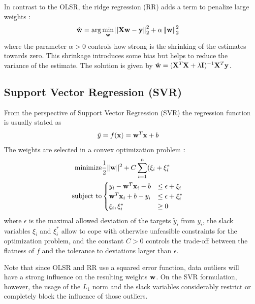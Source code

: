 In contrast to the OLSR, the ridge regression (RR) adds a term to
penalize large weights \citep{scikitlearn2011}:
\begin{equation*}
\hat{\mathbf{w}} = 
\arg\min_{\mathbf{w}} \left\| \mathbf{X}\mathbf{w} - \mathbf{y} \right\|_2^2 + 
                 \alpha \left\|\mathbf{w}\right\|_2^2 
\end{equation*}
where the parameter $\alpha>0$ controls how strong is the shrinking of
the estimates towards zero.  This shrinkage introduces some bias but
helps to reduce the variance of the estimate.
%
The solution is given by $\hat{\mathbf{w}}=(\mathbf{X}^T\mathbf{X} +
\lambda\mathbf{I})^{-1}\mathbf{X}^T \mathbf{y}$.

\subsection{Support Vector Regression (SVR)}


From the perspective of Support Vector Regression (SVR) the regression
function is usually stated as 
\begin{equation}
\label{eq:svrfunc}
  \tilde{y} = f(\mathbf{x}) = \mathbf{w}^T\mathbf{x} + b
\end{equation}
The weights are selected in a convex optimization problem
\citep{Smola2004}:
\begin{align*}
  \text{minimize}   & \frac{1}{2}\|\mathbf{w}\|^2 + C\sum_{i=1}^n(\xi_i+\xi_i^\ast \\
  \text{subject to} & 
  \begin{cases}
    y_i - \mathbf{w}^T\mathbf{x}_i - b &\leq \epsilon + \xi_i    \\
    \mathbf{w}^T\mathbf{x}_i + b -y_i  &\leq \epsilon + \xi_i^\ast\\
    \xi_i,\xi_i^\ast               &\geq 0
  \end{cases}
\end{align*}
where $\epsilon$ is the maximal allowed deviation of the targets
$\tilde{y}_i$ from $y_i$, the slack variables $\xi_i$ and $\xi_i^\ast$
allow to cope with otherwise unfeasible constraints for the
optimization problem, and the constant $C>0$ controls the trade-off
between the flatness of $f$ and the tolerance to deviations larger
than $\epsilon$.

Note that since OLSR and RR use a squared error function, data
outliers will have a strong influence on the resulting weights
$\mathbf{w}$.  On the SVR formulation, however, the usage of the $L_1$
norm and the slack variables considerably restrict or completely block
the influence of those outliers.

